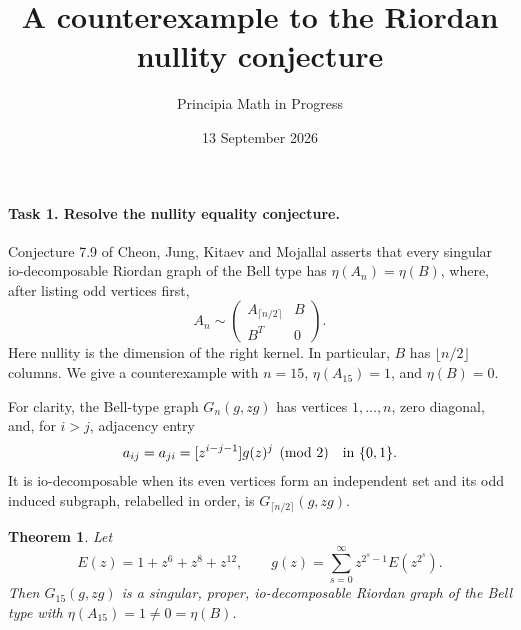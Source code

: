 \documentclass[10pt]{article}
\title{A counterexample to the Riordan nullity conjecture}
\author{Principia Math in Progress}
\date{13 September 2026}
\newtheorem{theorem}{Theorem}
\begin{document}
\maketitle

\paragraph{Task 1. Resolve the nullity equality conjecture.}
Conjecture 7.9 of Cheon, Jung, Kitaev and Mojallal \cite{CJKM} asserts
that every singular io-decomposable Riordan graph of the Bell type has
\(\eta(A_n)=\eta(B)\), where, after listing odd vertices first,
\[
 A_n\sim\begin{pmatrix} A_{\lceil n/2\rceil}&B\\B^T&0\end{pmatrix}.
\]
Here nullity is the dimension of the right kernel. In particular,
\(B\) has \(\lfloor n/2\rfloor\) columns. We give a counterexample
with \(n=15\), \(\eta(A_{15})=1\), and \(\eta(B)=0\).

For clarity, the Bell-type graph \(G_n(g,zg)\) has vertices
\(1,\ldots,n\), zero diagonal, and, for \(i>j\), adjacency entry
\begin{equation}\label{entry}
 a_{ij}=a_{ji}=[z^{i-j-1}]g(z)^j\pmod2\quad\hbox{in }\{0,1\}.
\end{equation}
It is io-decomposable when its even vertices form an independent
set and its odd induced subgraph, relabelled in order, is
\(G_{\lceil n/2\rceil}(g,zg)\).

\begin{theorem}
Let
\[
 E(z)=1+z^6+z^8+z^{12},\qquad
 g(z)=\sum_{s=0}^{\infty}z^{2^s-1}E(z^{2^s}).
\]
Then \(G_{15}(g,zg)\) is a singular, proper, io-decomposable
Riordan graph of the Bell type with
\(\eta(A_{15})=1\ne0=\eta(B)\).
\end{theorem}
\end{document}
